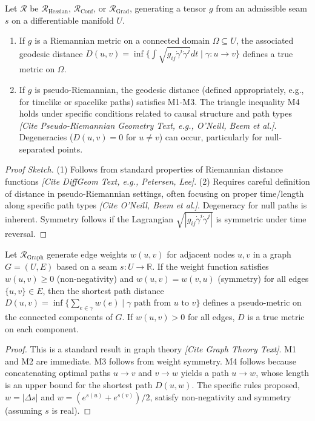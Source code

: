 \documentclass[twoside,twocolumn]{article}
\begin{document}
\begin{proposition} \label{prop:diff_metric_props}
Let \( \mathcal{R} \) be \( \mathcal{R}_{\text{Hessian}} \), \( \mathcal{R}_{\text{Conf}} \), or \( \mathcal{R}_{\text{Grad}} \), generating a tensor \( g \) from an admissible seam \( s \) on a differentiable manifold \( U \).
\begin{enumerate}
    \item If \( g \) is a Riemannian metric on a connected domain \( \Omega \subseteq U \), the associated geodesic distance \( D(u, v) = \inf \{\int \sqrt{g_{ij}\dot{\gamma}^i\dot{\gamma}^j} dt \mid \gamma: u \to v\} \) defines a true metric on \( \Omega \).
    \item If \( g \) is pseudo-Riemannian, the geodesic distance (defined appropriately, e.g., for timelike or spacelike paths) satisfies M1-M3. The triangle inequality M4 holds under specific conditions related to causal structure and path types \textit{[Cite Pseudo-Riemannian Geometry Text, e.g., O'Neill, Beem et al.]}. Degeneracies (\( D(u,v)=0 \) for \( u \neq v \)) can occur, particularly for null-separated points.
\end{enumerate}
\end{proposition}
\begin{proof}[Proof Sketch]
(1) Follows from standard properties of Riemannian distance functions \textit{[Cite DiffGeom Text, e.g., Petersen, Lee]}. (2) Requires careful definition of distance in pseudo-Riemannian settings, often focusing on proper time/length along specific path types \textit{[Cite O'Neill, Beem et al.]}. Degeneracy for null paths is inherent. Symmetry follows if the Lagrangian \( \sqrt{|g_{ij}\dot{\gamma}^i\dot{\gamma}^j|} \) is symmetric under time reversal.
\end{proof}

\begin{proposition} \label{prop:graph_metric_props}
Let \( \mathcal{R}_{\text{Graph}} \) generate edge weights \( w(u, v) \) for adjacent nodes \( u, v \) in a graph \( G=(U, E) \) based on a seam \( s: U \to \mathbb{R} \). If the weight function satisfies \( w(u, v) \ge 0 \) (non-negativity) and \( w(u, v) = w(v, u) \) (symmetry) for all edges \( \{u, v\} \in E \), then the shortest path distance \( D(u, v) = \inf \{\sum_{e \in \gamma} w(e) \mid \gamma \text{ path from } u \text{ to } v\} \) defines a pseudo-metric on the connected components of \( G \). If \( w(u,v)>0 \) for all edges, \( D \) is a true metric on each component.
\end{proposition}
\begin{proof}
This is a standard result in graph theory \textit{[Cite Graph Theory Text]}. M1 and M2 are immediate. M3 follows from weight symmetry. M4 follows because concatenating optimal paths \( u \to v \) and \( v \to w \) yields a path \( u \to w \), whose length is an upper bound for the shortest path \( D(u,w) \). The specific rules proposed, \( w=|\Delta s| \) and \( w=(e^{s(u)}+e^{s(v)})/2 \), satisfy non-negativity and symmetry (assuming \( s \) is real).
\end{proof}
\end{document}
